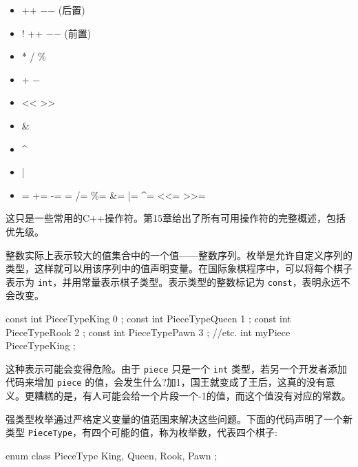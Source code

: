 \begin{itemize}
\item
++ \enspace −{}− (后置)

\item
! \enspace ++ \enspace −{}− (前置)

\item
* \enspace / \enspace \%

\item
+ \enspace −

\item
<{}< \enspace >{}>

\item
\&

\item
\textasciicircum

\item
|

\item
= \enspace += \enspace -= \enspace *= \enspace /= \enspace \%= \enspace \&= \enspace |= \enspace \textasciicircum= \enspace <{}<= \enspace >{}>=

\end{itemize}

这只是一些常用的C++操作符。第15章给出了所有可用操作符的完整概述，包括优先级。


整数实际上表示较大的值集合中的一个值——整数序列。枚举是允许自定义序列的类型，这样就可以用该序列中的值声明变量。在国际象棋程序中，可以将每个棋子表示为 \verb|int|，并用常量表示棋子类型。表示类型的整数标记为 \verb|const|，表明永远不会改变。

\begin{cpp}
const int PieceTypeKing { 0 };
const int PieceTypeQueen { 1 };
const int PieceTypeRook { 2 };
const int PieceTypePawn { 3 };
//etc.
int myPiece { PieceTypeKing };
\end{cpp}

这种表示可能会变得危险。由于 \verb|piece| 只是一个 \verb|int| 类型，若另一个开发者添加代码来增加 \verb|piece| 的值，会发生什么?加1，国王就变成了王后，这真的没有意义。更糟糕的是，有人可能会给一个片段一个-1的值，而这个值没有对应的常数。

强类型枚举通过严格定义变量的值范围来解决这些问题。下面的代码声明了一个新类型 \verb|PieceType|，有四个可能的值，称为枚举数，代表四个棋子:

\begin{cpp}
enum class PieceType { King, Queen, Rook, Pawn };
\end{cpp}

